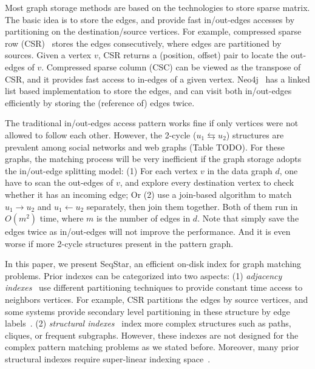 Most graph storage methods are based on the technologies to store sparse matrix.
The basic idea is to store the edges, and provide fast in/out-edges accesses by partitioning on the destination/source vertices.
For example, compressed sparse row (CSR)~\cite{1447941} stores the edges consecutively, where edges are partitioned by sources.
Given a vertex $v$, CSR returns a (position, offset) pair to locate the out-edges of $v$.
Compressed sparse column (CSC) can be viewed as the transpose of CSR, and it provides fast access to in-edges of a given vertex.
Neo4j~\cite{Neo4j} has a linked list based implementation to store the edges, and can visit both in/out-edges efficiently by storing the (reference of) edges twice.

The traditional in/out-edges access pattern works fine if only vertices were not allowed to follow each other.
However, the 2-cycle ($u_1 \leftrightarrows u_2$) structures are prevalent among social networks and web graphs (Table TODO).
For these graphs, the matching process will be very inefficient if the graph storage adopts the in/out-edge splitting model:
(1) For each vertex $v$ in the data graph $d$, one have to scan the out-edges of $v$, and explore every destination vertex to check whether it has an incoming edge;
Or (2) use a join-based algorithm to match $u_1 \rightarrow u_2$ and $u_1 \leftarrow u_2$ separately, then join them together.
Both of them run in $O(m^2)$ time, where $m$ is the number of edges in $d$.
Note that simply save the edges twice as in/out-edges will not improve the performance.
And it is even worse if more 2-cycle structures present in the pattern graph.

In this paper, we present SeqStar, an efficient on-disk index for graph matching problems.
Prior indexes can be categorized into two aspects:
(1) \emph{adjacency indexes}~\cite{bonifati2018querying} use different partitioning techniques to provide constant time access to neighbors vertices.
For example, CSR partitions the edges by source vertices, and some systems provide secondary level partitioning in these structure by edge labels~\cite{DBLP:conf/icde/MhedhbiGKS21}.
(2) \emph{structural indexes}~\cite{DBLP:conf/europar/SumrallFPSVVW16,DBLP:journals/pvldb/LaiQLZC16,DBLP:journals/pvldb/ZhuQLYHY11} index more complex structures such as paths, cliques, or frequent subgraphs.
However, these indexes are not designed for the complex pattern matching problems as we stated before.
Moreover, many prior structural indexes require super-linear indexing space~\cite{DBLP:journals/pvldb/SunWWSL12}.


